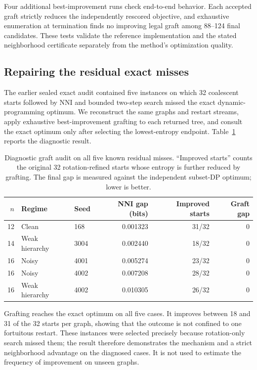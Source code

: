 Four additional best-improvement runs check end-to-end behavior. Each accepted
graft strictly reduces the independently rescored objective, and exhaustive
enumeration at termination finds no improving legal graft among 88--124 final
candidates. These tests validate the reference implementation and the stated
neighborhood certificate separately from the method's optimization quality.

\subsection{Repairing the residual exact misses}\label{sec:graft-audit}

The earlier sealed exact audit contained five instances on which 32
coalescent starts followed by NNI and bounded two-step search missed the exact
dynamic-programming optimum. We reconstruct the same graphs and restart
streams, apply exhaustive best-improvement grafting to each returned tree, and
consult the exact optimum only after selecting the lowest-entropy endpoint.
Table~\ref{tab:graft-repair} reports the diagnostic result.

\begin{table}[t]
\centering
\small
\setlength{\tabcolsep}{4pt}
\caption{Diagnostic graft audit on all five known residual misses. ``Improved
starts'' counts the original 32 rotation-refined starts whose entropy is
further reduced by grafting. The final gap is measured against the independent
subset-DP optimum; lower is better.}
\label{tab:graft-repair}
\begin{tabular}{rllrrr}
\toprule
$n$ & Regime & Seed & NNI gap (bits) & Improved starts & Graft gap \\
\midrule
12 & Clean          & 168  & 0.001323 & 31/32 & 0 \\
14 & Weak hierarchy & 3004 & 0.002440 & 18/32 & 0 \\
16 & Noisy          & 4001 & 0.005274 & 23/32 & 0 \\
16 & Noisy          & 4002 & 0.007208 & 28/32 & 0 \\
16 & Weak hierarchy & 4002 & 0.010305 & 26/32 & 0 \\
\bottomrule
\end{tabular}
\end{table}

Grafting reaches the exact optimum on all five cases. It improves between 18
and 31 of the 32 starts per graph, showing that the outcome is not confined to
one fortuitous restart. These instances were selected precisely because
rotation-only search missed them; the result therefore demonstrates the
mechanism and a strict neighborhood advantage on the diagnosed cases. It is
not used to estimate the frequency of improvement on unseen graphs.


